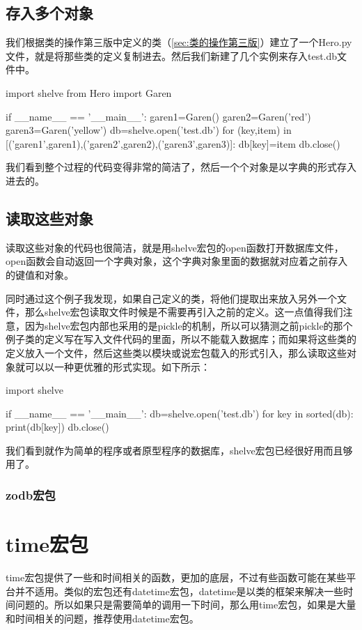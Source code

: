 \documentclass[12pt,oneside]{book}
\begin{document}
\begin{common-format}
\section{存入多个对象}
我们根据类的操作第三版中定义的类（\ref{sec:类的操作第三版}）建立了一个Hero.py文件，就是将那些类的定义复制进去。然后我们新建了几个实例来存入test.db文件中。

\begin{tcbpython}
import shelve
from Hero import Garen

if __name__ == '__main__':
    garen1=Garen()
    garen2=Garen('red')
    garen3=Garen('yellow')
    db=shelve.open('test.db')
    for (key,item) in [('garen1',garen1),('garen2',garen2),('garen3',garen3)]:
        db[key]=item
    db.close()
\end{tcbpython}

我们看到整个过程的代码变得非常的简洁了，然后一个个对象是以字典的形式存入进去的。

\section{读取这些对象}
读取这些对象的代码也很简洁，就是用shelve宏包的open函数打开数据库文件，open函数会自动返回一个字典对象，这个字典对象里面的数据就对应着之前存入的键值和对象。

同时通过这个例子我发现，如果自己定义的类，将他们提取出来放入另外一个文件，那么shelve宏包读取文件时候是不需要再引入之前的定义。这一点值得我们注意，因为shelve宏包内部也采用的是pickle的机制，所以可以猜测之前pickle的那个例子类的定义写在写入文件代码的里面，所以不能载入数据库；而如果将这些类的定义放入一个文件，然后这些类以模块或说宏包载入的形式引入，那么读取这些对象就可以以一种更优雅的形式实现。如下所示：
\begin{tcbpython}
import shelve

if __name__ == '__main__':
    db=shelve.open('test.db')
    for key in sorted(db):
        print(db[key])
    db.close()
\end{tcbpython}

我们看到就作为简单的程序或者原型程序的数据库，shelve宏包已经很好用而且够用了。

\subsection{zodb宏包}


\chapter{time宏包}
time宏包提供了一些和时间相关的函数，更加的底层，不过有些函数可能在某些平台并不适用。类似的宏包还有datetime宏包，datetime是以类的框架来解决一些时间问题的。所以如果只是需要简单的调用一下时间，那么用time宏包，如果是大量和时间相关的问题，推荐使用datetime宏包。


\end{common-format}
\end{document}
